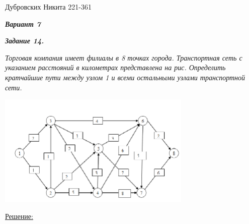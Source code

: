 \documentclass[12pt]{article}
\begin{document}
Дубровских Никита 221-361

\textit{\textbf{Вариант 7}}

\textit{\textbf{Задание 14.}}

\textit{Торговая компания имеет филиалы в 8 точках города. Транспортная
сеть с указанием расстояний в километрах представлена на рис. Определить
кратчайшие пути между узлом 1 и всеми остальными узлами транспортной
сети.}

\includegraphics[width=350]{14_task.png}

\underline{Решение:}
\end{document}
